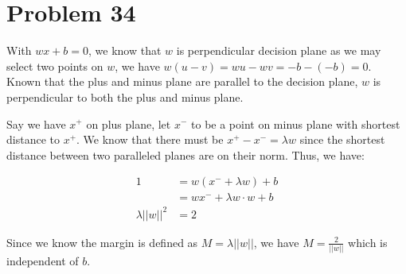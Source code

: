 \documentclass[12pt]{article}
\begin{document}
\section{Problem 34}

With $wx +b = 0$, we know that $w$ is perpendicular decision plane as we may select two points on $w$, we have $w(u - v) = wu - wv = -b -(-b) = 0$. Known that the plus and minus plane are parallel to the decision plane, $w$ is perpendicular to both the plus and minus plane.

Say we have $x^+$ on plus plane, let $x^-$ to be a point on minus plane with shortest distance to $x^+$. We know that there must be $x^+ - x^- = \lambda w$ since the shortest distance between two paralleled planes are on their norm. Thus, we have:

\begin{align*}
    1 &= w(x^- + \lambda w) + b \\
    &= wx^- + \lambda w \cdot w + b \\
    \lambda ||w||^2 &= 2
\end{align*}

Since we know the margin is defined as $M = \lambda||w||$, we have $M = \frac{2}{||w||}$ which is independent of $b$.


\end{document}
